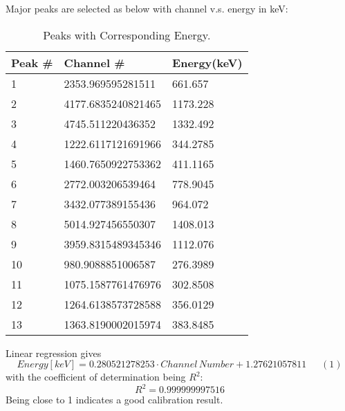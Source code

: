 Major peaks are selected as below with channel v.s. energy in keV:

\begin{table}[h!]
  \begin{center}
    \caption{Peaks with Corresponding Energy.}
    \label{tab:table1}
    \begin{tabular}{l|l|l}
      \textbf{Peak \#} & \textbf{Channel \#} & \textbf{Energy(keV)}\\
      \hline
      1 & 2353.969595281511 & 661.657\\
      2 & 4177.6835240821465 & 1173.228\\
      3 & 4745.511220436352  & 1332.492\\
      4 & 1222.6117121691966  & 344.2785\\
      5 & 1460.7650922753362  & 411.1165\\
      6 & 2772.003206539464  & 778.9045\\
      7 & 3432.077389155436 & 964.072\\
      8 & 5014.927456550307 & 1408.013\\
      9 & 3959.8315489345346 & 1112.076\\
      10 & 980.9088851006587  & 276.3989\\
      11 & 1075.1587761476976 & 302.8508\\
      12 & 1264.6138573728588 & 356.0129\\
      13 & 1363.8190002015974 & 383.8485\\
 
    \end{tabular}
  \end{center}
\end{table}
Linear regression gives
\[Energy[keV]=0.280521278253 \cdot Channel\,Number+1.27621057811\,\,\,\,\,\,\,\,\,(1)\]
with the coefficient of determination being ${R^2}$:
\[{R^2}=0.999999997516\]
Being close to 1 indicates a good calibration result.


